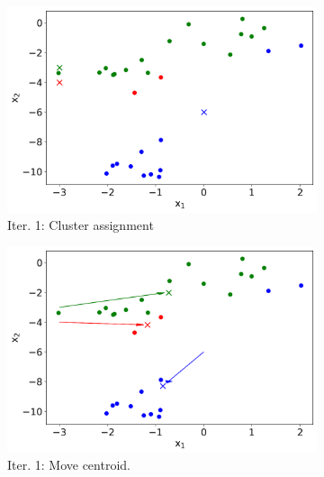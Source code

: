 \begin{figure}
     \centering
     \begin{subfigure}[b]{0.48\textwidth}
         \centering
         \includegraphics[width=\textwidth]{"Part 3 - Learning Systems/Unsupervised Learning/k-Means/images/CA1.png"}
         \caption{Iter. 1: Cluster assignment}
         \label{fig:k-means-loop-1-ca}
     \end{subfigure}
     \hfill
     \begin{subfigure}[b]{0.48\textwidth}
         \centering
         \includegraphics[width=\textwidth]{"Part 3 - Learning Systems/Unsupervised Learning/k-Means/images/MC1.png"}
         \caption{Iter. 1: Move centroid.}
         \label{fig:k-means-loop-1-mc}
     \end{subfigure}
     \hfill
     \begin{subfigure}[b]{0.48\textwidth}
         \centering

\end{subfigure}
\end{figure}
